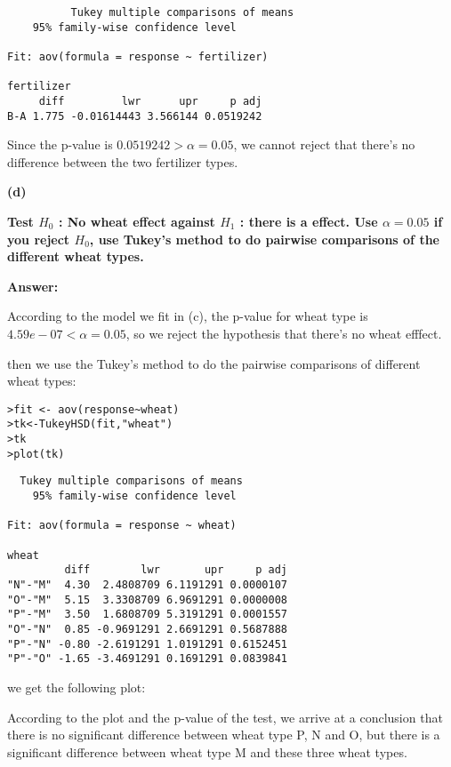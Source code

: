 \documentclass[letterpaper,11pt]{article}
\begin{document}
\begin{lstlisting}
          Tukey multiple comparisons of means
    95% family-wise confidence level

Fit: aov(formula = response ~ fertilizer)

fertilizer
     diff         lwr      upr     p adj
B-A 1.775 -0.01614443 3.566144 0.0519242
        \end{lstlisting}
Since the p-value is $0.0519242>\alpha=0.05$, we cannot reject that there's no difference between the two fertilizer types.\par

\bigbreak
\begin{addmargin}[-1.1em]{0em}
\textbf{(d)}\par\end{addmargin}


\textbf{Test $H_0$ : No wheat effect against $H_1$ : there is a effect. Use $\alpha = 0.05$ if you reject $H_0$, use Tukey’s method to do pairwise comparisons of the different wheat types.}\par
    \bigbreak
    \begin{addmargin}[-0.5em]{0em}
    \textbf{Answer: }\end{addmargin}

According to the model we fit in (c), the p-value for wheat type is $4.59e-07<\alpha = 0.05$, so we reject the hypothesis that there's no wheat efffect.\par
 then we use the Tukey's method to do the pairwise comparisons of different wheat types:
\begin{lstlisting}
>fit <- aov(response~wheat)
>tk<-TukeyHSD(fit,"wheat")
>tk
>plot(tk)
\end{lstlisting}

\begin{lstlisting}
  Tukey multiple comparisons of means
    95% family-wise confidence level

Fit: aov(formula = response ~ wheat)

wheat
         diff        lwr       upr     p adj
"N"-"M"  4.30  2.4808709 6.1191291 0.0000107
"O"-"M"  5.15  3.3308709 6.9691291 0.0000008
"P"-"M"  3.50  1.6808709 5.3191291 0.0001557
"O"-"N"  0.85 -0.9691291 2.6691291 0.5687888
"P"-"N" -0.80 -2.6191291 1.0191291 0.6152451
"P"-"O" -1.65 -3.4691291 0.1691291 0.0839841
\end{lstlisting}

we get the following plot:



According to the plot and the p-value of the test, we arrive at a conclusion that there is no significant difference between wheat type P, N and O, but there is a significant difference between wheat type M and these three wheat types.
\end{document}
